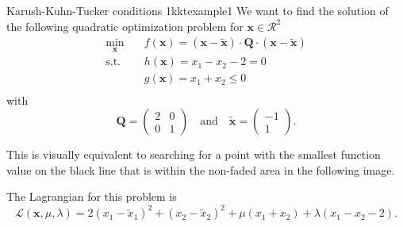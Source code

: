 \begin{example}{Karush-Kuhn-Tucker conditions 1}{kktexample1}
    We want to find the solution of the following quadratic optimization problem for $\mathbf{x} \in \mathcal{R}^2$
    \begin{equation}
        \begin{aligned}
            \min_{\mathbf{x}} \quad & f(\mathbf{x})= (\mathbf{x}-\tilde{\mathbf{x}}) \cdot \mathbf{Q} \cdot (\mathbf{x}-\tilde{\mathbf{x}})\\
            \textrm{s.t.} \quad     & h(\mathbf{x}) = x_1 - x_2 - 2 = 0  \\
                          \quad     & g(\mathbf{x}) = x_1 + x_2 \le 0  \\
        \end{aligned}
    \end{equation}
    with 
    \begin{equation}
        \mathbf{Q} = 
        \begin{pmatrix}
        2 & 0 \\
        0 & 1 
        \end{pmatrix} 
        \quad 
        \text{and}
        \quad
        \tilde{\mathbf{x}} = 
        \begin{pmatrix}
        -1\\
        1 
        \end{pmatrix}.
    \end{equation}

    This is visually equivalent to searching for a point with the smallest function value on the black line that is within the non-faded area in the following image.
    \begin{center}
        
    \end{center}

    The Lagrangian for this problem is 
    \begin{equation}
        \mathcal{L}(\mathbf{x}, \mu, \lambda) = 2 (x_1-\tilde{x}_1)^2 + (x_2-\tilde{x}_2)^2 + \mu (x_1+x_2) + \lambda (x_1 - x_2 -2).
    \end{equation}


\end{example}

